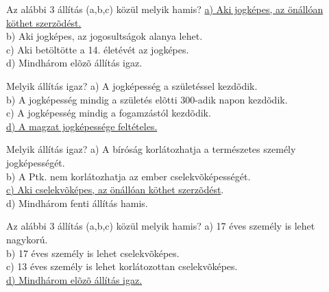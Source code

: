 \begin{frame}  

\begin{tcolorbox}[title={40. Kérdés}]
Az alábbi 3 állítás (a,b,c) közül melyik hamis?
\tcblower
\uline {a) Aki jogképes, az önállóan köthet szerzõdést.}\\
b) Aki jogképes, az jogosultságok alanya lehet.\\
c) Aki betöltötte a 14. életévét az jogképes.\\
d) Mindhárom elõzõ állítás igaz.
\end{tcolorbox}

\begin{tcolorbox}[title={41. Kérdés}]
Melyik állítás igaz?
\tcblower
a) A jogképesség a születéssel kezdõdik.\\
b) A jogképesség mindig a születés elõtti 300-adik napon kezdõdik.\\
c) A jogképesség mindig a fogamzástól kezdõdik.\\
\uline {d) A magzat jogképessége feltételes.}
\end{tcolorbox}

\begin{tcolorbox}[title={42. Kérdés}]
Melyik állítás igaz?
\tcblower
a) A bíróság korlátozhatja a természetes személy jogképességét.\\
b) A Ptk. nem korlátozhatja az ember cselekvõképességét.\\
\uline {c) Aki cselekvõképes, az önállóan köthet szerzõdést}.\\
d) Mindhárom fenti állítás hamis.
\end{tcolorbox}

\begin{tcolorbox}[title={43. Kérdés}]
Az alábbi 3 állítás (a,b,c) közül melyik hamis?
\tcblower
a) 17 éves személy is lehet nagykorú.\\
b) 17 éves személy is lehet cselekvõképes.\\
c) 13 éves személy is lehet korlátozottan cselekvõképes.\\
\uline {d) Mindhárom elõzõ állítás igaz.}
\end{tcolorbox}

\end{frame}


